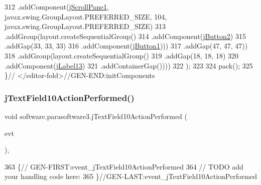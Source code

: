 \begin{DoxyCode}
312                             .addComponent(\mbox{\hyperlink{classsoftware_1_1parasoftware3_aaeb200a8e3cbd49b6ee645ee670e5af7}{jScrollPane1}}, javax.swing.GroupLayout.PREFERRED\_SIZE,
       104, javax.swing.GroupLayout.PREFERRED\_SIZE)
313                             .addGroup(layout.createSequentialGroup()
314                                 .addComponent(\mbox{\hyperlink{classsoftware_1_1parasoftware3_aa69f792b77392d92a3821f9d35b0cf27}{jButton2}})
315                                 .addGap(33, 33, 33)
316                                 .addComponent(\mbox{\hyperlink{classsoftware_1_1parasoftware3_a64399e1ff0c22252784a8fb418269e32}{jButton1}})))
317                         .addGap(47, 47, 47))
318                     .addGroup(layout.createSequentialGroup()
319                         .addGap(18, 18, 18)
320                         .addComponent(\mbox{\hyperlink{classsoftware_1_1parasoftware3_a7b6fbb00c7d61828f62e29c35188d960}{jLabel13}})
321                         .addContainerGap())))
322         );
323 
324         pack();
325     \}\textcolor{comment}{// </editor-fold>//GEN-END:initComponents}
\end{DoxyCode}
\mbox{\label{classsoftware_1_1parasoftware3_a457010d249cc595838f8cd5a65a94a0a}} 
\subsubsection{\texorpdfstring{j\+Text\+Field10\+Action\+Performed()}{jTextField10ActionPerformed()}}
{\footnotesize\ttfamily void software.\+parasoftware3.\+j\+Text\+Field10\+Action\+Performed (\begin{DoxyParamCaption}\item[{java.\+awt.\+event.\+Action\+Event}]{evt }\end{DoxyParamCaption})\hspace{0.3cm}{\ttfamily [inline]}, {\ttfamily [private]}}


\begin{DoxyCode}
363                                                                              \{\textcolor{comment}{//
      GEN-FIRST:event\_jTextField10ActionPerformed}
364         \textcolor{comment}{// TODO add your handling code here:}
365     \}\textcolor{comment}{//GEN-LAST:event\_jTextField10ActionPerformed}
\end{DoxyCode}
\mbox{\label{classsoftware_1_1parasoftware3_a761e7d64ea660c9877635a7951cb801e}} 
